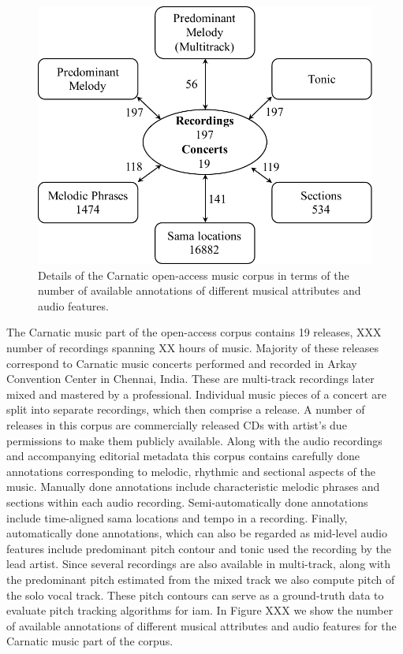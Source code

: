 \begin{figure}
	\begin{center}
		\includegraphics[width=\figSizeNinety]{ch04_datasets/figures/carnatic_CC_details.pdf}
	\end{center}
	\caption{Details of the Carnatic open-access music corpus in terms of the number of available annotations of different musical attributes and audio features.}
	\label{fig:carnatic_open_access_corpus_details}
\end{figure}


The Carnatic music part of the open-access corpus contains 19 releases, XXX number of recordings spanning XX hours of music. Majority of these releases correspond to Carnatic music concerts performed and recorded in Arkay Convention Center in Chennai, India. These are multi-track recordings later mixed and mastered by a professional. Individual music pieces of a concert are split into separate recordings, which then comprise a release. A number of releases in this corpus are commercially released CDs with artist's due permissions to make them publicly available. Along with the audio recordings and accompanying editorial metadata this corpus contains carefully done annotations corresponding to melodic, rhythmic and sectional aspects of the music. Manually done annotations include characteristic melodic phrases and sections within each audio recording. Semi-automatically done annotations include time-aligned sama locations and tempo in a recording. Finally, automatically done annotations, which can also be regarded as mid-level audio features include predominant pitch contour and tonic used the recording by the lead artist. Since several recordings are also available in multi-track, along with the predominant pitch estimated from the mixed track we also compute pitch of the solo vocal track. These pitch contours can serve as a ground-truth data to evaluate pitch tracking algorithms for \gls{iam}. In Figure XXX we show the number of available annotations of different musical attributes and audio features for the Carnatic music part of the corpus.



